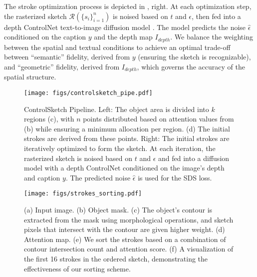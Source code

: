 The stroke optimization process is depicted in , right.
At each optimization step, the rasterized sketch $\mathcal{R}(\{s_i\}_{i=1}^n)$ is noised based on $t$ and $\epsilon$, then fed into a depth ControlNet text-to-image diffusion model \cite{controlnet2023}. The model predicts the noise $\hat{\epsilon}$ conditioned on the caption $y$ and the depth map $I_{depth}$.
We balance the weighting between the spatial and textual conditions to achieve an optimal trade-off between ``semantic'' fidelity, derived from $y$ (ensuring the sketch is recognizable), and ``geometric'' fidelity, derived from $I_{depth}$, which governs the accuracy of the spatial structure. 





\begin{figure}
    \centering
    \texttt{[image: figs/controlsketch\_pipe.pdf]}
    \caption{ControlSketch Pipeline. Left: The object area is divided into $k$ regions (c), with $n$ points distributed based on attention values from (b) while ensuring a minimum allocation per region. (d) The initial strokes are derived from these points. Right: The initial strokes are iteratively optimized to form the sketch. At each iteration, the rasterized sketch is noised based on $t$ and $\epsilon$ and fed into a diffusion model with a depth ControlNet conditioned on the image's depth and caption $y$. The predicted noise $\hat{\epsilon}$ is used for the SDS loss.}
    \label{fig:ControlSketch_pipeline}
\end{figure}

\begin{figure}
    \centering
    \texttt{[image: figs/strokes\_sorting.pdf]}
    \caption{(a) Input image. (b) Object mask. (c) The object's contour is extracted from the mask using morphological operations, and sketch pixels that intersect with the contour are given higher weight. (d) Attention map. (e) We sort the strokes based on a combination of contour intersection count and attention score. (f) A visualization of the first 16 strokes in the ordered sketch, demonstrating the effectiveness of our sorting scheme.}
    \label{fig:sketchsort}
\end{figure}



